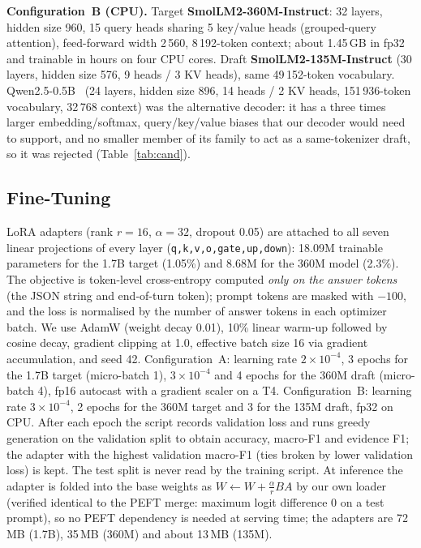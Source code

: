 \textbf{Configuration~B (CPU).} Target \textbf{SmolLM2-360M-Instruct}: 32 layers, hidden size 960, 15 query heads sharing 5 key/value heads (grouped-query attention), feed-forward width 2\,560, 8\,192-token context; about 1.45\,GB in fp32 and trainable in hours on four CPU cores. Draft \textbf{SmolLM2-135M-Instruct} (30 layers, hidden size 576, 9 heads / 3 KV heads), same 49\,152-token vocabulary. Qwen2.5-0.5B~\cite{qwen2024qwen25} (24 layers, hidden size 896, 14 heads / 2 KV heads, 151\,936-token vocabulary, 32\,768 context) was the alternative decoder: it has a three times larger embedding/softmax, query/key/value biases that our decoder would need to support, and no smaller member of its family to act as a same-tokenizer draft, so it was rejected (Table~\ref{tab:cand}).

\begin{table}[t]\centering\caption{Candidate decoders, computed from their configuration files (fp32 weights in decimal GB; KV = cache bytes per token in fp32).}\label{tab:cand}
\footnotesize\setlength{\tabcolsep}{2.5pt}\resizebox{\columnwidth}{!}{}\end{table}

\subsection{Fine-Tuning}
LoRA adapters (rank $r=16$, $\alpha=32$, dropout 0.05) are attached to all seven linear projections of every layer (\texttt{q,k,v,o,gate,up,down}): 18.09M trainable parameters for the 1.7B target (1.05\%) and 8.68M for the 360M model (2.3\%). The objective is token-level cross-entropy computed \emph{only on the answer tokens} (the JSON string and end-of-turn token); prompt tokens are masked with $-100$, and the loss is normalised by the number of answer tokens in each optimizer batch. We use AdamW (weight decay 0.01), 10\% linear warm-up followed by cosine decay, gradient clipping at 1.0, effective batch size 16 via gradient accumulation, and seed 42. Configuration~A: learning rate $2\times10^{-4}$, 3 epochs for the 1.7B target (micro-batch 1), $3\times10^{-4}$ and 4 epochs for the 360M draft (micro-batch 4), fp16 autocast with a gradient scaler on a T4. Configuration~B: learning rate $3\times10^{-4}$, 2 epochs for the 360M target and 3 for the 135M draft, fp32 on CPU. After each epoch the script records validation loss and runs greedy generation on the validation split to obtain accuracy, macro-F1 and evidence F1; the adapter with the highest validation macro-F1 (ties broken by lower validation loss) is kept. The test split is never read by the training script. At inference the adapter is folded into the base weights as $W\leftarrow W+\tfrac{\alpha}{r}BA$ by our own loader (verified identical to the PEFT merge: maximum logit difference 0 on a test prompt), so no PEFT dependency is needed at serving time; the adapters are 72\,MB (1.7B), 35\,MB (360M) and about 13\,MB (135M).

